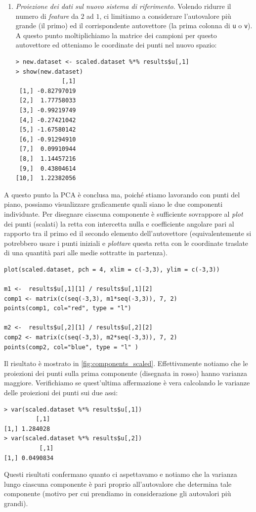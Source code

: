 \begin{esempio}
\begin{enumerate}
\item \emph{Proiezione dei dati sul nuovo sistema di riferimento}. Volendo ridurre il numero di \emph{feature} da $2$ ad $1$, ci limitiamo a considerare l'autovalore più grande (il primo) ed il corrispondente autovettore (la prima colonna di \texttt{u} o \texttt{v}).
A questo punto moltiplichiamo la matrice dei campioni per questo autovettore ed otteniamo le coordinate dei punti nel nuovo spazio:
\begin{lstlisting}
> new.dataset <- scaled.dataset %*% results$u[,1] 
> show(new.dataset)
             [,1]
 [1,] -0.82797019
 [2,]  1.77758033
 [3,] -0.99219749
 [4,] -0.27421042
 [5,] -1.67580142
 [6,] -0.91294910
 [7,]  0.09910944
 [8,]  1.14457216
 [9,]  0.43804614
[10,]  1.22382056
\end{lstlisting}



\end{enumerate}

A questo punto la PCA è conclusa ma, poiché stiamo lavorando con punti del piano, possiamo visualizzare graficamente quali siano le due componenti individuate. Per disegnare ciascuna componente è sufficiente sovrappore al \emph{plot} dei punti (scalati) la retta con intercetta nulla e coefficiente angolare pari al rapporto tra il primo ed il secondo elemento dell'autovettore (equivalentemente si potrebbero usare i punti iniziali e \emph{plottare} questa retta con le coordinate traslate di una quantità pari alle medie sottratte in partenza).
\begin{lstlisting}
plot(scaled.dataset, pch = 4, xlim = c(-3,3), ylim = c(-3,3))

m1 <-  results$u[,1][1] / results$u[,1][2] 
comp1 <- matrix(c(seq(-3,3), m1*seq(-3,3)), 7, 2)
points(comp1, col="red", type = "l")

m2 <-  results$u[,2][1] / results$u[,2][2] 
comp2 <- matrix(c(seq(-3,3), m2*seq(-3,3)), 7, 2)
points(comp2, col="blue", type = "l" )
\end{lstlisting}
Il risultato è mostrato in \autoref{fig:components_scaled}. Effettivamente notiamo che le proiezioni dei punti sulla prima componente (disegnata in rosso) hanno varianza maggiore. Verifichiamo se quest'ultima affermazione è vera calcolando le varianze delle proiezioni dei punti sui due assi:
\begin{lstlisting}
> var(scaled.dataset %*% results$u[,1])
         [,1]
[1,] 1.284028
> var(scaled.dataset %*% results$u[,2])
          [,1]
[1,] 0.0490834
\end{lstlisting}
Questi risultati confermano quanto ci aspettavamo e notiamo che la varianza lungo ciascuna componente è pari proprio all'autovalore che determina tale componente (motivo per cui prendiamo in considerazione gli autovalori più grandi).


\end{esempio}
